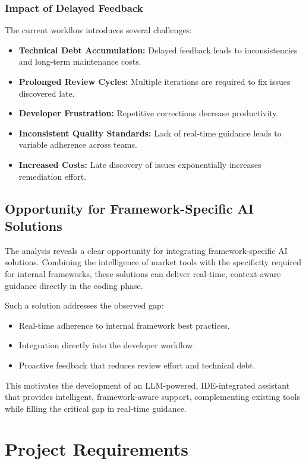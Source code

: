 \begin{spacing}{1.2}
\subsubsection{Impact of Delayed Feedback}

The current workflow introduces several challenges:

\begin{itemize}
\item \textbf{Technical Debt Accumulation:} Delayed feedback leads to inconsistencies and long-term maintenance costs.
\item \textbf{Prolonged Review Cycles:} Multiple iterations are required to fix issues discovered late.
\item \textbf{Developer Frustration:} Repetitive corrections decrease productivity.
\item \textbf{Inconsistent Quality Standards:} Lack of real-time guidance leads to variable adherence across teams.
\item \textbf{Increased Costs:} Late discovery of issues exponentially increases remediation effort.
\end{itemize}

\subsection{Opportunity for Framework-Specific AI Solutions}

The analysis reveals a clear opportunity for integrating framework-specific AI solutions. Combining the intelligence of market tools with the specificity required for internal frameworks, these solutions can deliver real-time, context-aware guidance directly in the coding phase.

Such a solution addresses the observed gap:

\begin{itemize}
\item Real-time adherence to internal framework best practices.
\item Integration directly into the developer workflow.
\item Proactive feedback that reduces review effort and technical debt.
\end{itemize}

This motivates the development of an LLM-powered, IDE-integrated assistant that provides intelligent, framework-aware support, complementing existing tools while filling the critical gap in real-time guidance.
\section{Project Requirements}


\end{spacing}
